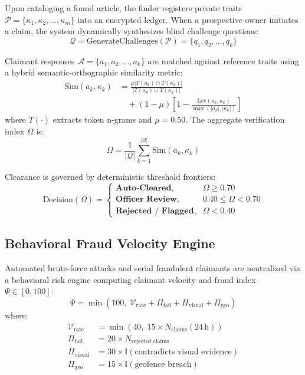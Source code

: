 \documentclass[conference]{IEEEtran}
\begin{document}
Upon cataloging a found article, the finder registers private traits $\mathcal{P} = \{\kappa_1, \kappa_2, \dots, \kappa_m\}$ into an encrypted ledger. When a prospective owner initiates a claim, the system dynamically synthesizes blind challenge questions:
\begin{equation}
    \mathcal{Q} = \text{GenerateChallenges}(\mathcal{P}) = \{q_1, q_2, \dots, q_k\}
\end{equation}

Claimant responses $\mathcal{A} = \{a_1, a_2, \dots, a_k\}$ are matched against reference traits using a hybrid semantic-orthographic similarity metric:
\begin{align}
    \text{Sim}(a_k, \kappa_k) &= \frac{\mu |T(a_k) \cap T(\kappa_k)|}{|T(a_k) \cup T(\kappa_k)|} \nonumber \\
    &\quad + (1 - \mu)\left[1 - \frac{\text{Lev}(a_k, \kappa_k)}{\max(|a_k|, |\kappa_k|)}\right]
\end{align}
where $T(\cdot)$ extracts token n-grams and $\mu = 0.50$. The aggregate verification index $\Omega$ is:
\begin{equation}
    \Omega = \frac{1}{|\mathcal{Q}|} \sum_{k=1}^{|\mathcal{Q}|} \text{Sim}(a_k, \kappa_k)
\end{equation}

Clearance is governed by deterministic threshold frontiers:
\begin{equation}
    \text{Decision}(\Omega) = \begin{cases} 
        \textbf{Auto-Cleared}, & \Omega \ge 0.70 \\ 
        \textbf{Officer Review}, & 0.40 \le \Omega < 0.70 \\ 
        \textbf{Rejected / Flagged}, & \Omega < 0.40 
    \end{cases}
\end{equation}

\subsection{Behavioral Fraud Velocity Engine}
Automated brute-force attacks and serial fraudulent claimants are neutralized via a behavioral risk engine computing claimant velocity and fraud index $\Psi \in [0, 100]$:
\begin{equation}
    \Psi = \min\left(100, \; \mathcal{V}_{\text{rate}} + \Pi_{\text{fail}} + \Pi_{\text{visual}} + \Pi_{\text{geo}}\right)
\end{equation}
where:
\begin{align}
    \mathcal{V}_{\text{rate}} &= \min\left(40, \; 15 \times N_{\text{claims}}(24\,\text{h})\right) \\
    \Pi_{\text{fail}} &= 20 \times N_{\text{rejected\_claims}} \\
    \Pi_{\text{visual}} &= 30 \times \mathbb{I}(\text{contradicts visual evidence}) \\
    \Pi_{\text{geo}} &= 15 \times \mathbb{I}(\text{geofence breach})
\end{align}
\end{document}

